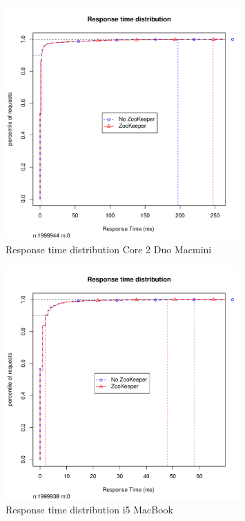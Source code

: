 \begin{figure}[h]
    \centering
    \includegraphics[width=0.8\textwidth]{results/distribution/distribution_macmini}
    \caption{Response time distribution Core 2 Duo Macmini}
    \label{fig:dist_knut}
\end{figure}

\begin{figure}[h]
    \centering
    \includegraphics[width=0.8\textwidth]{results/distribution/distribution_knut}
    \caption{Response time distribution i5 MacBook}
    \label{fig:dist_knut}
\end{figure}

